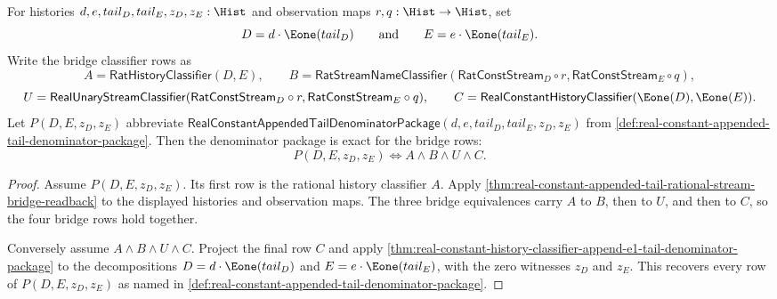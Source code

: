 \begin{theorem}
\label{thm:real-constant-appended-tail-bridge-denominator-package-exactness}
For histories $d,e,tail_D,tail_E,z_D,z_E:\Hist$ and observation maps
$r,q:\Hist\to\Hist$, set
$$
D=d\cdot\Eone(tail_D)
\qquad\text{and}\qquad
E=e\cdot\Eone(tail_E).
$$
Write the bridge classifier rows as
$$
A=\mathsf{RatHistoryClassifier}(D,E),
\qquad
B=\mathsf{RatStreamNameClassifier}(\mathsf{RatConstStream}_D\circ r,
\mathsf{RatConstStream}_E\circ q),
$$
$$
U=\mathsf{RealUnaryStreamClassifier}(\mathsf{RatConstStream}_D\circ r,
\mathsf{RatConstStream}_E\circ q),
\qquad
C=\mathsf{RealConstantHistoryClassifier}(\Eone(D),\Eone(E)).
$$
Let $P(D,E,z_D,z_E)$ abbreviate
$\mathsf{RealConstantAppendedTailDenominatorPackage}
(d,e,tail_D,tail_E,z_D,z_E)$ from
\autoref{def:real-constant-appended-tail-denominator-package}.
Then the denominator package is exact for the bridge rows:
$$
P(D,E,z_D,z_E)\Longleftrightarrow A\land B\land U\land C.
$$
\end{theorem}
\begin{proof}
Assume $P(D,E,z_D,z_E)$. Its first row is the rational history classifier
$A$. Apply
\autoref{thm:real-constant-appended-tail-rational-stream-bridge-readback} to
the displayed histories and observation maps. The three bridge equivalences
carry $A$ to $B$, then to $U$, and then to $C$, so the four bridge rows hold
together.

Conversely assume $A\land B\land U\land C$. Project the final row $C$ and
apply
\autoref{thm:real-constant-history-classifier-append-e1-tail-denominator-package}
to the decompositions $D=d\cdot\Eone(tail_D)$ and
$E=e\cdot\Eone(tail_E)$, with the zero witnesses $z_D$ and $z_E$. This
recovers every row of $P(D,E,z_D,z_E)$ as named in
\autoref{def:real-constant-appended-tail-denominator-package}.
\end{proof}

